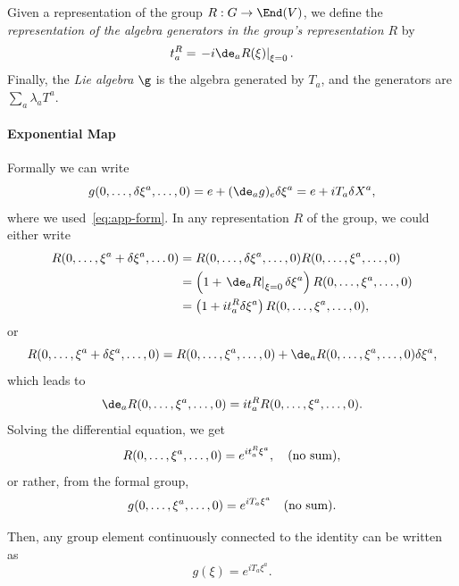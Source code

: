 Given a representation of the group $R: G \to \End(V)$, we define the \emph{representation of the algebra generators in the group's representation $R$} by
\begin{equation}
    t^R_a = \left. -i \de_a R(\xi) \right|_{\xi=0} .
\end{equation}
Finally, the \emph{Lie algebra} $\g$ is the algebra generated by $T_a$, and the generators are $\sum_a \lambda_a T^a$.

\paragraph{Exponential Map}
Formally we can write
\begin{equation}
    g(0,\dots, \delta \xi^a, \dots, 0) = e + (\de_a g)_e \delta \xi^a = e + i T_a \delta X^a,
\end{equation}
where we used~\eqref{eq:app-form}. In any representation $R$ of the group, we could either write
\begin{equation}
\begin{aligned}
    R(0, \dots, \xi^a + \delta \xi^a, \dots 0) &= R(0, \dots, \delta \xi^a, \dots, 0) R(0, \dots, \xi^a, \dots, 0)  \\
    &= \left( 1 + \left. \de_a R\right|_{\xi=0} \delta \xi^a \right) R(0, \dots, \xi^a, \dots, 0) \\
    &= \left( 1 + i t^R_a \delta \xi^a \right) R(0, \dots, \xi^a, \dots, 0)  ,
\end{aligned}
\end{equation}
or
\begin{equation}
    R(0, \dots, \xi^a + \delta \xi^a, \dots, 0) = R(0, \dots, \xi^a, \dots, 0) + \de_a R(0, \dots, \xi^a, \dots, 0) \delta \xi^a ,
\end{equation}
which leads to
\begin{equation}
    \de_a R(0, \dots, \xi^a, \dots, 0) = i t^R_a R(0, \dots, \xi^a, \dots, 0).
\end{equation}
Solving the differential equation, we get
\begin{equation}
    R(0, \dots, \xi^a, \dots, 0) = e^{i t^R_a \xi^a}, \quad \textup{(no sum)},
\end{equation}
or rather, from the formal group,
\begin{equation}
    g(0, \dots, \xi^a, \dots, 0) = e^{i T_a \xi^a} \quad \textup{(no sum)}.
\end{equation}

Then, any group element continuously connected to the identity can be written as
\begin{equation}
    g(\xi) = e^{i T_a \xi^a} .
\end{equation}

